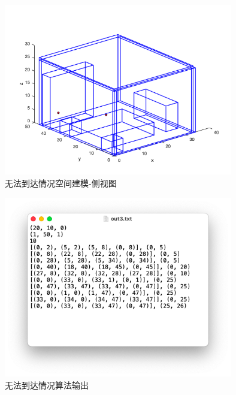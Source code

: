 \begin{figure}[!htb]
    \centering
    \includegraphics[width=10cm]{figures/test_not_situation_pic_lean.png}
    \caption{无法到达情况空间建模-侧视图}
    \label{fig:test_not_situation_pic_lean}
\end{figure}
\begin{figure}[!htb]
    \centering
    \includegraphics[width=10cm]{figures/test_not_situation_out.png}
    \caption{无法到达情况算法输出}
    \label{fig:test_not_situation_out}
\end{figure}

\FloatBarrier
